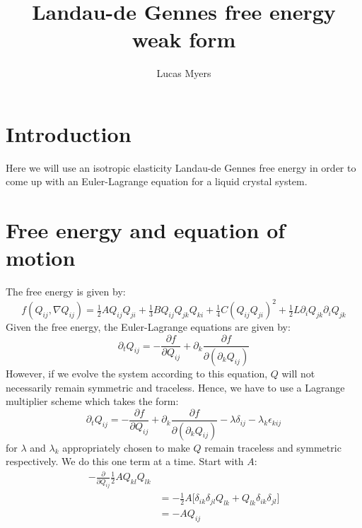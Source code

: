 \documentclass[reqno]{article}
\begin{document}
	\title{Landau-de Gennes free energy weak form}
	\author{Lucas Myers}
	\maketitle
	
	\section{Introduction}
	Here we will use an isotropic elasticity Landau-de Gennes free energy in order to come up with an Euler-Lagrange equation for a liquid crystal system.
	
	\section{Free energy and equation of motion}
	The free energy is given by:
	\begin{equation}
		f(Q_{ij}, \nabla Q_{ij})
		= \tfrac12 A Q_{ij} Q_{ji}
		+ \tfrac13 B Q_{ij} Q_{jk} Q_{ki}
		+ \tfrac14 C (Q_{ij} Q_{ji})^2
		+ \tfrac12 L \partial_i Q_{jk} \partial_i Q_{jk}
	\end{equation}
	Given the free energy, the Euler-Lagrange equations are given by:
	\begin{equation}
		\partial_t Q_{ij}
		= - \frac{\partial f}{\partial Q_{ij}}
		+ \partial_k \frac{\partial f}{\partial (\partial_k Q_{ij})}
	\end{equation}
    However, if we evolve the system according to this equation, $Q$ will not necessarily remain symmetric and traceless. 
    Hence, we have to use a Lagrange multiplier scheme which takes the form:
    \begin{equation}
		\partial_t Q_{ij}
		= - \frac{\partial f}{\partial Q_{ij}}
		+ \partial_k \frac{\partial f}{\partial (\partial_k Q_{ij})}
        - \lambda \delta_{ij}
        - \lambda_k \epsilon_{kij}
    \end{equation}
    for $\lambda$ and $\lambda_k$ appropriately chosen to make $Q$ remain traceless and symmetric respectively.
	We do this one term at a time.
	Start with $A$:
	\begin{equation}
	\begin{split}
		-\frac{\partial}{\partial Q_{ij}}
		\tfrac12 A Q_{kl} Q_{lk} \\
		&= -\tfrac12 A \bigl[ 
		\delta_{ik} \delta_{jl} Q_{lk}
		+ Q_{lk} \delta_{ik} \delta_{jl}
		\bigr] \\
		&= -A Q_{ij}
	\end{split}
	\end{equation}
\end{document}
